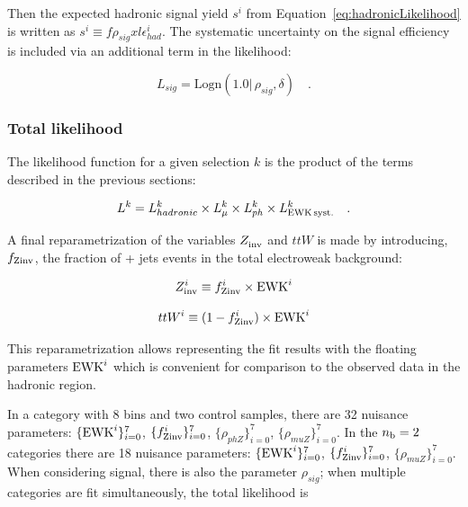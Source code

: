 Then the expected hadronic signal yield $s^i$ from
Equation~\ref{eq:hadronicLikelihood} is written as $s^i \equiv
f\rho_{sig} xl\epsilon_{had}^i$. The systematic uncertainty on
the signal efficiency is included via an additional term in the
likelihood:

\begin{equation}
L_{sig}=\mathrm{Logn}(1.0 |\,\rho_{sig}, \delta) \quad .
\end{equation}

\subsubsection{Total likelihood}
\label{sec:totalLikelihood}

The likelihood function for a given selection $k$ is the product of
the terms described in the previous sections:

\begin{equation}
L^k = L_{hadronic}^k \times L_{\mu}^k \times L_{ph}^k \times
L_{\rm EWK\, syst.}^k \quad .
\end{equation}

A final reparametrization of the variables $Z_{\rm inv}^{}$ and $ttW$ is made
by introducing, $f_{\rm Zinv}$, the fraction of \znunu + jets events in the total
electroweak background:

\begin{equation}
  Z_{\rm inv}^{i} \equiv f_{\rm Zinv}^{i} \times \mathrm{EWK}^i 
  \label{eq:ZinvEwk}
\end{equation}

\begin{equation}
  ttW^{i} \equiv (1-f_{\rm Zinv}^{i})\times \mathrm{EWK}^i
  \label{eq:ttWEwk}
\end{equation}


This reparametrization allows representing the fit results with the floating
parameters $\mathrm{EWK}^{i}$ which is convenient for comparison to the observed data
in the hadronic region. 

In a category with 8 \HT bins and two control samples, there are 
32 nuisance parameters: $\{\mathrm{EWK}^{i}\}_{i=0}^{7}$, $\{f_{\rm Zinv}^{i}\}_{i=0}^{7}$, $\{\rho_{phZ}\}_{i=0}^{7}$,
$\{\rho_{muZ}\}_{i=0}^{7}$. In the $n_{\text{b}} = 2$ categories there are 
18 nuisance parameters: $\{\mathrm{EWK}^{i}\}_{i=0}^{7}$, $\{f_{\rm Zinv}^{i}\}_{i=0}^{7}$, 
$\{\rho_{muZ}\}_{i=0}^{7}$.  When considering signal, 
there is also the parameter $\rho_{sig}$; when multiple categories 
are fit simultaneously, the total likelihood is

